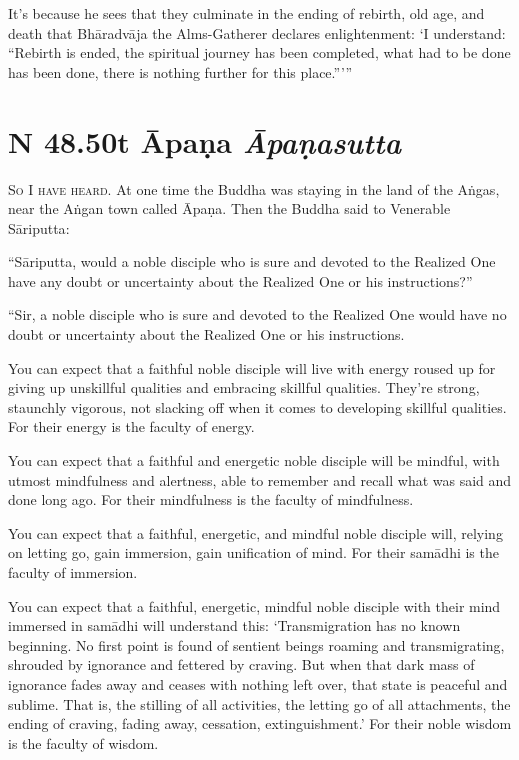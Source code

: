 \documentclass[12pt,openany]{book}%
\newcommand*{\suttatitleacronym}[1]{\smaller[2]{#1}\vspace*{.3em}}
\newcommand*{\suttatitletranslation}[1]{\linebreak{#1}}
\newcommand*{\suttatitleroot}[1]{\linebreak\smaller[2]\itshape{#1}}
\newcommand*{\tocacronym}[1]{\hspace*{-3.3em}{#1}\quad}
\newcommand*{\toctranslation}[1]{#1}
\newcommand*{\tocroot}[1]{(\textit{#1})}
\newcommand*{\scevam}[1]{\textsc{#1}}
\begin{document}
It’s because he sees that they culminate in the ending of rebirth, old age, and death that \textsanskrit{Bhāradvāja} the Alms-Gatherer declares enlightenment: ‘I understand: “Rebirth is ended, the spiritual journey has been completed, what had to be done has been done, there is nothing further for this place.”’” 

%
\section*{{\suttatitleacronym SN 48.50}{\suttatitletranslation At Āpaṇa }{\suttatitleroot Āpaṇasutta}}
\addcontentsline{toc}{section}{\tocacronym{SN 48.50} \toctranslation{At Āpaṇa } \tocroot{Āpaṇasutta}}

\scevam{So I have heard. }At one time the Buddha was staying in the land of the \textsanskrit{Aṅgas}, near the \textsanskrit{Aṅgan} town called \textsanskrit{Āpaṇa}. Then the Buddha said to Venerable \textsanskrit{Sāriputta}: 

“\textsanskrit{Sāriputta}, would a noble disciple who is sure and devoted to the Realized One have any doubt or uncertainty about the Realized One or his instructions?” 

“Sir, a noble disciple who is sure and devoted to the Realized One would have no doubt or uncertainty about the Realized One or his instructions. 

You can expect that a faithful noble disciple will live with energy roused up for giving up unskillful qualities and embracing skillful qualities. They’re strong, staunchly vigorous, not slacking off when it comes to developing skillful qualities. For their energy is the faculty of energy. 

You can expect that a faithful and energetic noble disciple will be mindful, with utmost mindfulness and alertness, able to remember and recall what was said and done long ago. For their mindfulness is the faculty of mindfulness. 

You can expect that a faithful, energetic, and mindful noble disciple will, relying on letting go, gain immersion, gain unification of mind. For their \textsanskrit{samādhi} is the faculty of immersion. 

You can expect that a faithful, energetic, mindful noble disciple with their mind immersed in \textsanskrit{samādhi} will understand this: ‘Transmigration has no known beginning. No first point is found of sentient beings roaming and transmigrating, shrouded by ignorance and fettered by craving. But when that dark mass of ignorance fades away and ceases with nothing left over, that state is peaceful and sublime. That is, the stilling of all activities, the letting go of all attachments, the ending of craving, fading away, cessation, extinguishment.’ For their noble wisdom is the faculty of wisdom. 
\end{document}
